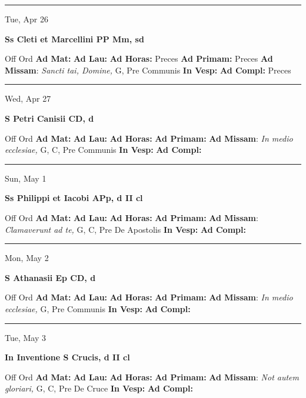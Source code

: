 \documentclass[letterpaper, 10pt]{article}
\begin{document}
\hrule
\begin{center}
Tue, Apr 26
\end{center}\textbf{ \large Ss Cleti et Marcellini PP Mm, \textnormal{\normalsize sd}}
\begin{justify}
Off Ord
\textbf{Ad Mat: }
\textbf{Ad Lau: }
\textbf{Ad Horas: }Preces
\textbf{Ad Primam: }Preces
\textbf{Ad Missam}: \textit{Sancti tai, Domine,} G, Pre Communis
\textbf{In Vesp: }
\textbf{Ad Compl: }Preces\end{justify}



\hrule
\begin{center}
Wed, Apr 27
\end{center}\textbf{ \large S Petri Canisii CD, \textnormal{\normalsize d}}
\begin{justify}
Off Ord
\textbf{Ad Mat: }
\textbf{Ad Lau: }
\textbf{Ad Horas: }
\textbf{Ad Primam: }
\textbf{Ad Missam}: \textit{In medio ecclesiae,} G, C, Pre Communis
\textbf{In Vesp: }
\textbf{Ad Compl: }\end{justify}



\hrule
\begin{center}
Sun, May 1
\end{center}\textbf{ \large Ss Philippi et Iacobi APp, \textnormal{\normalsize d II cl}}
\begin{justify}
Off Ord
\textbf{Ad Mat: }
\textbf{Ad Lau: }
\textbf{Ad Horas: }
\textbf{Ad Primam: }
\textbf{Ad Missam}: \textit{Clamaverunt ad te,} G, C, Pre De Apostolis
\textbf{In Vesp: }
\textbf{Ad Compl: }\end{justify}



\hrule
\begin{center}
Mon, May 2
\end{center}\textbf{ \large S Athanasii Ep CD, \textnormal{\normalsize d}}
\begin{justify}
Off Ord
\textbf{Ad Mat: }
\textbf{Ad Lau: }
\textbf{Ad Horas: }
\textbf{Ad Primam: }
\textbf{Ad Missam}: \textit{In medio ecclesiae,} G, Pre Communis
\textbf{In Vesp: }
\textbf{Ad Compl: }\end{justify}



\hrule
\begin{center}
Tue, May 3
\end{center}\textbf{ \large In Inventione S Crucis, \textnormal{\normalsize d II cl}}
\begin{justify}
Off Ord
\textbf{Ad Mat: }
\textbf{Ad Lau: }
\textbf{Ad Horas: }
\textbf{Ad Primam: }
\textbf{Ad Missam}: \textit{Not autem gloriari,} G, C, Pre De Cruce
\textbf{In Vesp: }
\textbf{Ad Compl: }\end{justify}
\end{document}
